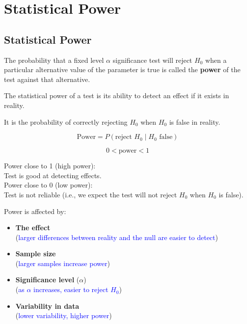 \setcounter{chapter}{12}  
\chapter{Statistical Power}

\section{Statistical Power}
\begin{definition}
The probability that a fixed level $\alpha$ significance test will reject $H_0$ when a particular alternative value of the parameter is true is called the \textbf{power} of the test against that alternative.
\end{definition}

The statistical power of a test is its ability to detect an effect if it exists in reality.

It is the probability of correctly rejecting $H_0$ when $H_0$ is false in reality.

\begin{equation*}
\text{Power} = P(\text{reject } H_0 \mid H_0 \text{ false})
\end{equation*}

\begin{equation*}
0 < \text{power} < 1
\end{equation*}

Power close to 1 (high power):\\
\quad Test is good at detecting effects.\\

Power close to 0 (low power):\\
\quad Test is not reliable (i.e., we expect the test will not reject $H_0$ when $H_0$ is false).

\vspace{1em}
Power is affected by:

\begin{itemize}
 \item \textbf{The effect} \\ (\textcolor{blue}{larger differences between reality and the null are easier to detect})

  \item \textbf{Sample size} \\ (\textcolor{blue}{larger samples increase power})

  \item \textbf{Significance level} ($\alpha$) \\ (\textcolor{blue}{as $\alpha$ increases, easier to reject $H_0$})

  \item \textbf{Variability in data} \\ (\textcolor{blue}{lower variability, higher power})
\end{itemize}
